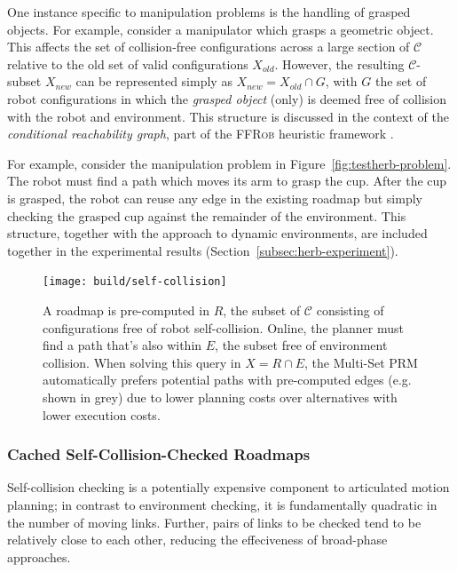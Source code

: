 One instance specific to manipulation problems is the handling of
grasped objects.
For example, 
consider a manipulator which grasps a geometric object.
This affects the set of collision-free configurations
across a large section of $\mathcal{C}$
relative to the old set of valid configurations $X_{old}$.
However,
the resulting $\mathcal{C}$-subset $X_{new}$
can be represented simply as
$X_{new} = X_{old} \cap G$,
with $G$ the set of robot configurations in which
the \emph{grasped object} (only)
is deemed free of collision with the robot and environment.
This structure is discussed in the context of the
\emph{conditional reachability graph},
part of the \textsc{FFRob} heuristic framework
\cite{garrett2014ffrob}.

For example,
consider the manipulation problem in
Figure~\ref{fig:testherb-problem}.
The robot must find a path which moves its arm to grasp the cup.
After the cup is grasped,
the robot can reuse any edge in the existing roadmap
but simply checking the grasped cup
against the remainder of the environment.
This structure,
together with the approach to dynamic environments,
are included together in the experimental results
(Section~\ref{subsec:herb-experiment}).

\begin{figure}
\centering
\texttt{[image: build/self-collision]}
\caption{A roadmap is pre-computed in $R$,
  the subset of $\mathcal{C}$ consisting of configurations free
  of robot self-collision.
  Online, the planner must find a path that's also within $E$,
  the subset free of environment collision.
  When solving this query in $X = R \cap E$,
  the Multi-Set PRM automatically prefers potential paths with
  pre-computed edges (e.g. shown in grey)
  due to lower planning costs over alternatives with lower
  execution costs.}
\label{fig:self-collision-example}
\end{figure}

\subsubsection*{Cached Self-Collision-Checked Roadmaps}
\label{subsec:cached-self-valid}

Self-collision checking is a potentially expensive component to
articulated motion planning;
in contrast to environment checking,
it is fundamentally quadratic in the number of moving links.
Further, pairs of links to be checked
tend to be relatively close to each other,
reducing the effeciveness of broad-phase approaches.

